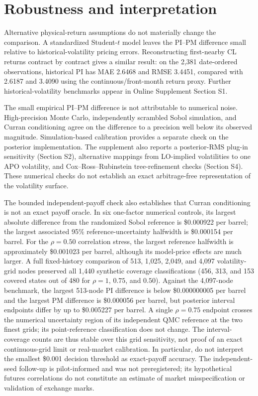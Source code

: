 \section{Robustness and interpretation}\label{sec:short_robustness}

Alternative physical-return assumptions do not materially change the comparison. A standardized Student-\(t\) model leaves the PI--PM difference small relative to historical-volatility pricing errors. Reconstructing first-nearby CL returns contract by contract gives a similar result: on the 2,381 date-ordered observations, historical PI has MAE 2.6468 and RMSE 3.4451, compared with 2.6187 and 3.4090 using the continuous/front-month return proxy. Further historical-volatility benchmarks appear in Online Supplement Section S1.

The small empirical PI--PM difference is not attributable to numerical noise. High-precision Monte Carlo, independently scrambled Sobol simulation, and Curran conditioning agree on the difference to a precision well below its observed magnitude. Simulation-based calibration provides a separate check on the posterior implementation. The supplement also reports a posterior-RMS plug-in sensitivity (Section S2), alternative mappings from LO-implied volatilities to one APO volatility, and Cox--Ross--Rubinstein tree-refinement checks (Section S4). These numerical checks do not establish an exact arbitrage-free representation of the volatility surface.

The bounded independent-payoff check also establishes that Curran
conditioning is not an exact payoff oracle. In six one-factor numerical
controls, its largest absolute difference from the randomized Sobol
reference is \$0.000922 per barrel; the largest associated 95\%
reference-uncertainty halfwidth is \$0.000154 per barrel. For the
$\rho=0.50$ correlation stress, the largest reference halfwidth is
approximately \$0.001023 per barrel, although its model-price effects
are much larger. A full fixed-history comparison of 513, 1,025, 2,049, and
4,097 volatility-grid nodes preserved all 1,440 synthetic
coverage classifications (456, 313, and 153 covered states
out of 480 for $\rho=1$, $0.75$, and $0.50$).
Against the 4,097-node benchmark, the largest 513-node
PI difference is below \$0.000000005 per barrel and the largest
PM difference is \$0.000056 per barrel, but posterior interval
endpoints differ by up to \$0.005227 per barrel.
A single $\rho=0.75$ endpoint crosses the numerical uncertainty
region of its independent QMC reference at the two finest
grids; its point-reference classification does not change.
The interval-coverage counts are thus stable over this grid
sensitivity, not proof of an exact continuous-grid limit or
real-market calibration. In particular, do not interpret the
smallest \$0.001 decision threshold as exact-payoff accuracy.
The independent-seed follow-up is pilot-informed and was not
preregistered; its hypothetical futures correlations do not constitute
an estimate of market misspecification or validation of exchange marks.

